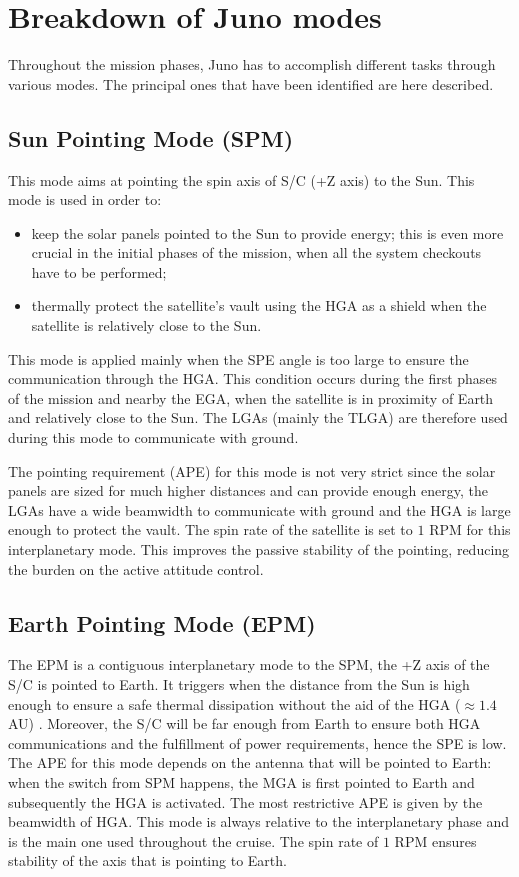 \section{Breakdown of Juno modes}
\label{sec:AOCS_modes}

Throughout the mission phases, Juno has to accomplish different tasks through various modes. The principal ones that have been identified are here described.

\subsection{Sun Pointing Mode (SPM)}
\label{subsec:sun_pointing_mode}

This mode aims at pointing the spin axis of S/C (+Z axis) to the Sun. This mode is used in order to:
\begin{itemize}
    \item keep the solar panels pointed to the Sun to provide energy; this is even more crucial in the initial phases of the mission, when all the system checkouts have to be performed;
    \item thermally protect the satellite's vault using the HGA as a shield when the satellite is relatively close to the Sun.
\end{itemize}

This mode is applied mainly when the SPE angle is too large to ensure the communication through the HGA. This condition occurs during the first phases of the mission and nearby the EGA, when the satellite is in proximity of Earth and relatively close to the Sun. The LGAs (mainly the TLGA) are therefore used during this mode to communicate with ground.

The pointing requirement (APE) for this mode is not very strict since the solar panels are sized for much higher distances and can provide enough energy, the LGAs have a wide beamwidth to communicate with ground and the HGA is large enough to protect the vault.
The spin rate of the satellite is set to $1$ RPM for this interplanetary mode. This improves the passive stability of the pointing, reducing the burden on the active attitude control.

\subsection{Earth Pointing Mode (EPM)}
\label{subsec:earth_pointing_mode}

The EPM is a contiguous interplanetary mode to the SPM, the +Z axis of the S/C is pointed to Earth.
It triggers when the distance from the Sun is high enough to ensure a safe thermal dissipation without the aid of the HGA ($\approx 1.4$ AU) \mref.
Moreover, the S/C will be far enough from Earth to ensure both HGA communications and the fulfillment of power requirements, hence the SPE is low. The APE for this mode depends on the antenna that will be pointed to Earth: when the switch from SPM happens, the MGA is first pointed to Earth and subsequently the HGA is activated. The most restrictive APE is given by the beamwidth of HGA. This mode is always relative to the interplanetary phase and is the main one used throughout the cruise. The spin rate of $1$ RPM ensures stability of the axis that is pointing to Earth.


